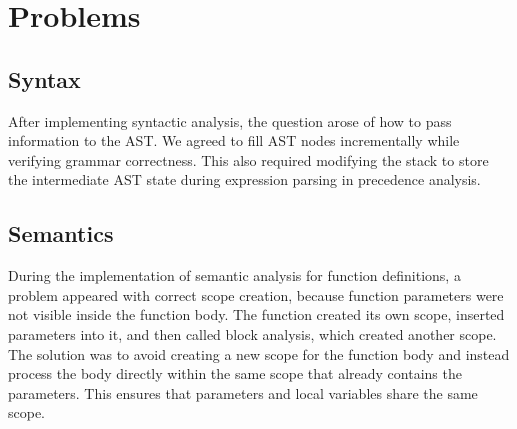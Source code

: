 \documentclass{article}
\begin{document}
\section{Problems}
\subsection{Syntax}
After implementing syntactic analysis, the question arose of how to pass information to the AST.  
We agreed to fill AST nodes incrementally while verifying grammar correctness.  
This also required modifying the stack to store the intermediate AST state during expression parsing in precedence analysis.

\subsection{Semantics}
During the implementation of semantic analysis for function definitions, a problem appeared with correct scope creation, because function parameters were not visible inside the function body.  
The function created its own scope, inserted parameters into it, and then called block analysis, which created another scope.  
The solution was to avoid creating a new scope for the function body and instead process the body directly within the same scope that already contains the parameters.  
This ensures that parameters and local variables share the same scope.
\end{document}
